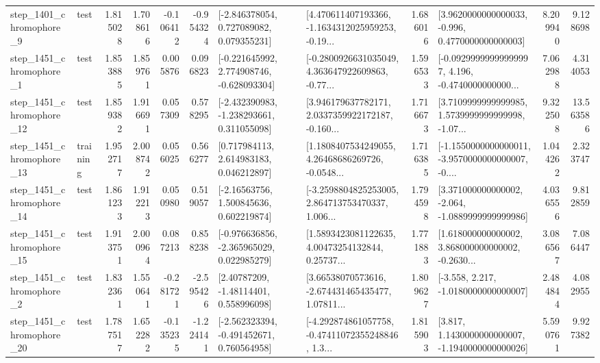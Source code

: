\begin{tabular}{llrrrrllrlrr}
  step\_1401\_chromophore\_9 &      test &      1.815028 &    1.708616 &     -0.106412 & -0.954324 &    [-2.846378054, 0.727089082, 0.079355231] &  [4.470611407193366, -1.1634312025959253, -0.19... &       1.686016 &   [3.9620000000000033, -0.996, 0.4770000000000003] &            8.209940 &          9.128698 \\
  step\_1451\_chromophore\_1 &      test &      1.853885 &    1.859761 &      0.005876 &  0.096823 &   [-0.221645992, 2.774908746, -0.628093304] &  [-0.2800926631035049, 4.363647922609863, -0.77... &       1.596533 &  [-0.09299999999999997, 4.196, -0.4740000000000... &            7.062988 &          4.314053 \\
 step\_1451\_chromophore\_12 &      test &      1.859382 &    1.916691 &      0.057309 &  0.578295 &   [-2.432390983, -1.238293661, 0.311055098] &  [3.946179637782171, 2.0337359922172187, -0.160... &       1.716673 &  [3.7109999999999985, 1.5739999999999998, -1.07... &            9.322508 &         13.563586 \\
 step\_1451\_chromophore\_13 &  training &      1.952717 &    2.008742 &      0.056025 &  0.566277 &     [0.717984113, 2.614983183, 0.046212897] &  [1.1808407534249055, 4.26468686269726, -0.0548... &       1.716385 &  [-1.1550000000000011, -3.9570000000000007, -0.... &            1.044262 &          2.323747 \\
 step\_1451\_chromophore\_14 &      test &      1.861233 &    1.912213 &      0.050980 &  0.519057 &     [-2.16563756, 1.500845636, 0.602219874] &  [-3.2598804825253005, 2.864713753470337, 1.006... &       1.794598 &   [3.371000000000002, -2.064, -1.0889999999999986] &            4.036556 &          9.812859 \\
 step\_1451\_chromophore\_15 &      test &      1.913751 &    2.000964 &      0.087213 &  0.858238 &   [-0.976636856, -2.365965029, 0.022985279] &  [1.5893423081122635, 4.00473254132844, 0.25737... &       1.771883 &  [1.618000000000002, 3.868000000000002, -0.2630... &            3.086567 &          7.086447 \\
  step\_1451\_chromophore\_2 &      test &      1.832361 &    1.550641 &     -0.281721 & -2.595426 &      [2.40787209, -1.48114401, 0.558996098] &  [3.66538070573616, -2.674431465435477, 1.07811... &       1.809627 &               [-3.558, 2.217, -1.0180000000000007] &            2.484844 &          4.082955 \\
 step\_1451\_chromophore\_20 &      test &      1.787517 &    1.652282 &     -0.135235 & -1.224141 &   [-2.562323394, -0.491452671, 0.760564958] &  [-4.292874861057758, -0.47411072355248846, 1.3... &       1.815903 &   [3.817, 1.1430000000000007, -1.1940000000000026] &            5.590761 &          9.927382 \\

\end{tabular}
